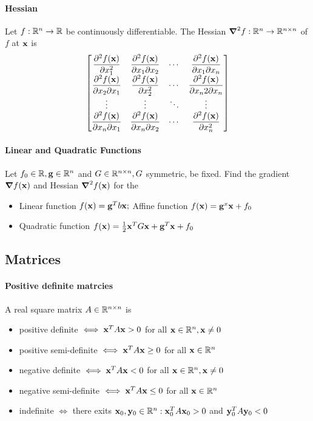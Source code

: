 \paragraph{Hessian}
Let \(f: \mathbb{R}^n \to \mathbb{R}\) be continuously differentiable. The Hessian \(\grad^2 f: \mathbb{R}^n \to \mathbb{R}^{n \times n}\) of \(f\) at \(\mathbf{x}\) is
\[
    \begin{bmatrix}
        \dfrac{\partial^2 f(\mathbf{x})}{\partial x_1^2}            & \dfrac{\partial^2 f(\mathbf{x})}{\partial x_1 \partial x_2} & \cdots & \dfrac{\partial^2 f(\mathbf{x})}{\partial x_1 \partial x_n}  \\
        \dfrac{\partial^2 f(\mathbf{x})}{\partial x_2\partial x_1}  & \dfrac{\partial^2 f(\mathbf{x})}{\partial x_2^2}            & \cdots & \dfrac{\partial^2 f(\mathbf{x})}{\partial x_n2 \partial x_n} \\
        \vdots                                            & \vdots                                            & \ddots & \vdots                                             \\
        \dfrac{\partial^2 f(\mathbf{x})}{\partial x_n \partial x_1} & \dfrac{\partial^2 f(\mathbf{x})}{\partial x_n \partial x_2} & \cdots & \dfrac{\partial^2 f(\mathbf{x})}{\partial x_n^2}             \\
    \end{bmatrix}
\]

\paragraph{Linear and Quadratic Functions}
Let \(f_0 \in \mathbb{R}, \mathbf{g} \in \mathbb{R}^n\) and \(G \in \mathbb{R}^{n \times n}, G\) symmetric, be fixed. Find the gradient \(\grad f(\mathbf{x}) \) and Hessian \(\grad^2 f(\mathbf{x})\) for the
\begin{itemize}
    \item Linear function \quad \(f(\mathbf{x}) = \mathbf{g}^Tb\mathbf{x};\) \quad Affine function \(f(\mathbf{x}) = \mathbf{g}^x\mathbf{x} + f_0\)
    \item Quadratic function \quad \(f(\mathbf{x}) = \frac{1}{2}\mathbf{x}^TG\mathbf{x} + \mathbf{g}^T\mathbf{x} + f_0\)
\end{itemize}

\subsection{Matrices}
\paragraph{Positive definite matrcies}
A real square matrix \(A \in \mathbb{R}^{n \times n}\) is
\begin{itemize}
    \item positive definite \(\iff \mathbf{x}^TA\mathbf{x} > 0\) for all \(\mathbf{x} \in \mathbb{R}^n, \mathbf{x} \neq 0\)
    \item positive semi-definite \(\iff \mathbf{x}^TA\mathbf{x} \geq 0\) for all \(\mathbf{x} \in \mathbb{R}^n\)
    \item negative definite \(\iff \mathbf{x}^TA\mathbf{x} < 0\) for all \(\mathbf{x} \in \mathbb{R}^n, \mathbf{x} \neq 0\)
    \item negative semi-definite \(\iff \mathbf{x}^TA\mathbf{x} \leq 0\) for all \(\mathbf{x} \in \mathbb{R}^n\)
    \item indefinite \(\iff\) there exits \(\mathbf{x}_0, \mathbf{y}_0 \in \mathbb{R}^n: \mathbf{x}_0^TA\mathbf{x}_0 > 0\) and \(\mathbf{y}_0^TA\mathbf{y}_0 < 0\)
\end{itemize}